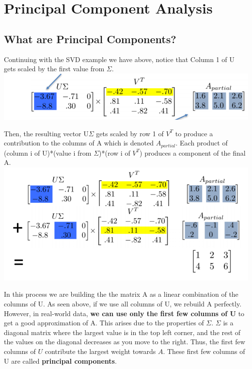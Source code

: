 \documentclass{article}
\begin{document}
\section{Principal Component Analysis}

\subsection{What are Principal Components?}
Continuing with the SVD example we have above, notice that Column 1 of U gets scaled by the first value from $\Sigma$.\\

\includegraphics[scale = 0.5]{Usig}

Then, the resulting vector U$\Sigma$ gets scaled by row 1 of $V^T$ to produce a contribution to the columns of A which is denoted $A_{partial}$. Each product of (column i of U)*(value i from $\Sigma$)*(row i of $V^T$) produces a component of the final A.\\

\includegraphics[scale = 0.5]{full_pca}

In this process we are building the the matrix A as a linear combination of the columns of U. As seen above, if we use all columns of U, we rebuild A perfectly. However, in real-world data, \textbf{we can use only the first few columns of U} to get a good approximation of A. This arises due to the properties of $\Sigma$. $\Sigma$ is a diagonal matrix where the largest value is in the top left corner, and the rest of the values on the diagonal decreases as you move to the right. Thus, the first few columns of $U$ contribute the largest weight towards $A$. These first few columns of U are called \textbf{principal components}.\\
\end{document}

